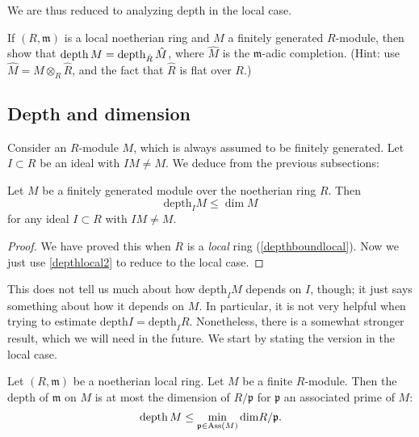 We are thus reduced to analyzing depth in the local case.

\begin{exercise} 
\label{exer:depthcompletion}
If $(R, \mathfrak{m})$ is a local noetherian ring and $M$ a finitely
generated $R$-module, then show that $\operatorname{depth} M = \operatorname{depth}_{\hat{R}} \hat{M}$,
where $\hat{M}$ is the $\mathfrak{m}$-adic completion. (Hint: use $\hat{M}= M
\otimes_R \hat{R}$, and the fact that $\hat{R}$ is flat over $R$.)
\end{exercise} 
\subsection{Depth and dimension}

Consider an $R$-module $M$, which is always assumed to be finitely generated.
Let $I \subset R$ be an ideal with $IM \neq M$. 
We deduce from the previous subsections:
\begin{proposition} 
Let $M$ be a finitely generated module over the noetherian ring $R$. Then
\[ \mathrm{depth}_I M \leq \dim M  \]
for any ideal $I \subset R$ with $IM \neq M$.
\end{proposition} 
\begin{proof} 
We have proved this when $R$ is a \emph{local}  ring
(\cref{depthboundlocal}). Now we just use \cref{depthlocal2} to reduce to the
local case. 
\end{proof} 

This does not tell us much about how $\mathrm{depth}_I M$ depends on $I$, though; it
just says something about how it depends on $M$. In particular, it is not very
helpful when trying to estimate $\mathrm{depth} I = \mathrm{depth}_I R$.
Nonetheless, there is a somewhat stronger result, which we will need in the
future.
We start by stating the version in the local case. 

\begin{proposition} \label{localdepthassbound}
Let $(R,\mathfrak{m})$ be a noetherian local ring. Let $M$ be a finite
$R$-module. Then the depth of $\mathfrak{m}$ on $M$ is at most the dimension of
$R/\mathfrak{p}$ for $\mathfrak{p}$ an associated prime of $M$:
\[ \operatorname{depth} M \leq \min_{\mathfrak{p} \in \operatorname{Ass}(M)}\mathrm{dim} R/\mathfrak{p}.  \]
\end{proposition} 


